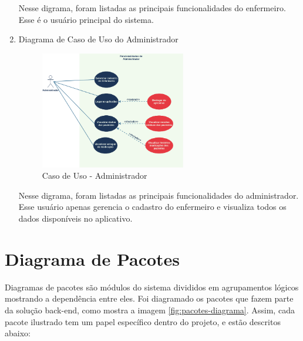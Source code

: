 \begin{enumerate}
Nesse digrama, foram listadas as principais funcionalidades do enfermeiro. Esse é o usuário principal do sistema.

    \item Diagrama de Caso de Uso do Administrador

\begin{figure}[H]
    \centering
    \includegraphics[width=0.6\textwidth]{figuras/administrador-us.png}
    \caption{Caso de Uso - Administrador}
    \label{fig:administrador_us}
\end{figure}

Nesse digrama, foram listadas as principais funcionalidades do administrador. Esse usuário apenas gerencia o cadastro do enfermeiro e visualiza todos os dados disponíveis no aplicativo.

\end{enumerate}

\section{Diagrama de Pacotes}

Diagramas de pacotes são módulos do sistema divididos em agrupamentos lógicos mostrando a dependência entre eles.
Foi diagramado os pacotes que fazem parte da solução back-end, como mostra a imagem \ref{fig:pacotes-diagrama}. Assim, cada pacote ilustrado tem um papel específico dentro do projeto, e estão descritos abaixo:

